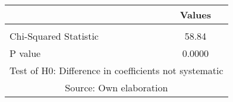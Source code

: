 
{
\begin{tabular}{lc} \hline
 & Values \\ \hline
 &  \\
Chi-Squared Statistic & 58.84 \\
P value & 0.0000 \\ \hline
\multicolumn{2}{c}{Test of H0: Difference in coefficients not systematic} \\
\multicolumn{2}{c}{Source: Own elaboration} \\
\end{tabular}
}

